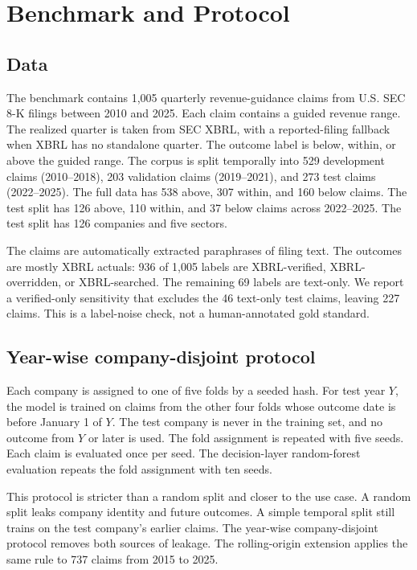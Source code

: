 \documentclass[11pt]{article}
\begin{document}
\section{Benchmark and Protocol}
\label{sec:benchmark}

\subsection{Data}
The benchmark contains 1,005 quarterly revenue-guidance claims from U.S. SEC 8-K filings between 2010 and 2025. Each claim contains a guided revenue range. The realized quarter is taken from SEC XBRL, with a reported-filing fallback when XBRL has no standalone quarter. The outcome label is below, within, or above the guided range. The corpus is split temporally into 529 development claims (2010--2018), 203 validation claims (2019--2021), and 273 test claims (2022--2025). The full data has 538 above, 307 within, and 160 below claims. The test split has 126 above, 110 within, and 37 below claims across 2022--2025. The test split has 126 companies and five sectors.

The claims are automatically extracted paraphrases of filing text. The outcomes are mostly XBRL actuals: 936 of 1,005 labels are XBRL-verified, XBRL-overridden, or XBRL-searched. The remaining 69 labels are text-only. We report a verified-only sensitivity that excludes the 46 text-only test claims, leaving 227 claims. This is a label-noise check, not a human-annotated gold standard.

\subsection{Year-wise company-disjoint protocol}
Each company is assigned to one of five folds by a seeded hash. For test year $Y$, the model is trained on claims from the other four folds whose outcome date is before January 1 of $Y$. The test company is never in the training set, and no outcome from $Y$ or later is used. The fold assignment is repeated with five seeds. Each claim is evaluated once per seed. The decision-layer random-forest evaluation repeats the fold assignment with ten seeds.

This protocol is stricter than a random split and closer to the use case. A random split leaks company identity and future outcomes. A simple temporal split still trains on the test company's earlier claims. The year-wise company-disjoint protocol removes both sources of leakage. The rolling-origin extension applies the same rule to 737 claims from 2015 to 2025.
\end{document}
